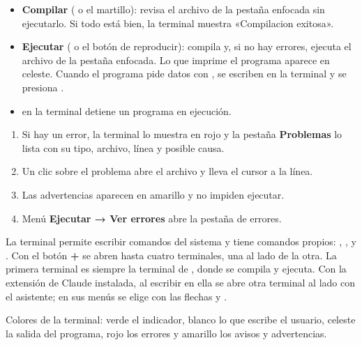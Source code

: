 
\begin{itemize}
  \item \textbf{Compilar} ( o el martillo): revisa el archivo  de la pestaña enfocada sin ejecutarlo. Si todo está bien, la terminal muestra «Compilacion exitosa».
  \item \textbf{Ejecutar} ( o el botón de reproducir): compila y, si no hay errores, ejecuta el archivo  de la pestaña enfocada. Lo que imprime el programa aparece en celeste. Cuando el programa pide datos con , se escriben en la terminal y se presiona .
  \item {} en la terminal detiene un programa en ejecución.
\end{itemize}


\begin{enumerate}
  \item Si hay un error, la terminal lo muestra en rojo y la pestaña \textbf{Problemas} lo lista con su tipo, archivo, línea y posible causa.
  \item Un clic sobre el problema abre el archivo y lleva el cursor a la línea.
  \item Las advertencias aparecen en amarillo y no impiden ejecutar.
  \item Menú \textbf{Ejecutar → Ver errores} abre la pestaña de errores.
\end{enumerate}


La terminal permite escribir comandos del sistema y tiene comandos propios: , ,  y . Con el botón \textbf{+} se abren hasta cuatro terminales, una al lado de la otra. La primera terminal es siempre la terminal de \ggez, donde se compila y ejecuta. Con la extensión de Claude instalada, al escribir  en ella se abre otra terminal al lado con el asistente; en sus menús se elige con las flechas y .

Colores de la terminal: verde el indicador, blanco lo que escribe el usuario, celeste la salida del programa, rojo los errores y amarillo los avisos y advertencias.


